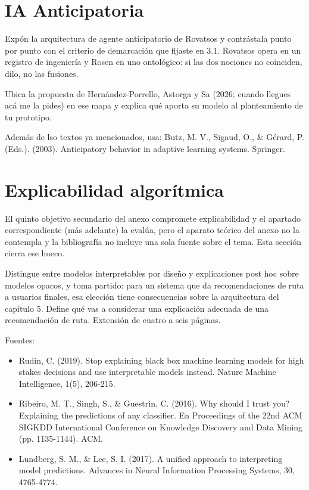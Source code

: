 \documentclass[letterpaper,12pt,oneside]{book}
\theoremstyle{definition}
\theoremstyle{plain}
\theoremstyle{remark}
\begin{document}
\section{IA Anticipatoria}
Expón la arquitectura de agente anticipatorio de Rovatsos y contrástala punto por punto con el criterio de demarcación que fijaste en 3.1. Rovatsos opera en un registro de ingeniería y Rosen en uno ontológico: si las dos nociones no coinciden, dilo, no las fusiones.

Ubica la propuesta de Hernández-Porrello, Astorga y Sa (2026; cuando llegues acá me la pides) en ese mapa y explica qué aporta su modelo al planteamiento de tu prototipo.

Además de lso textos ya mencionados, usa: Butz, M. V., Sigaud, O., \& Gérard, P. (Eds.). (2003). Anticipatory behavior in adaptive learning systems. Springer.

\section{Explicabilidad algorítmica}
El quinto objetivo secundario del anexo compromete explicabilidad y el apartado correspondiente (más adelante) la evalúa, pero el aparato teórico del anexo no la contempla y la bibliografía no incluye una sola fuente sobre el tema. Esta sección cierra ese hueco.

Distingue entre modelos interpretables por diseño y explicaciones post hoc sobre modelos opacos, y toma partido: para un sistema que da recomendaciones de ruta a usuarios finales, esa elección tiene consecuencias sobre la arquitectura del capítulo 5. Define qué vas a considerar una explicación adecuada de una recomendación de ruta. Extensión de cuatro a seis páginas.

Fuentes:

\begin{itemize}
    \item Rudin, C. (2019). Stop explaining black box machine learning models for high stakes decisions and use interpretable models instead. Nature Machine Intelligence, 1(5), 206-215. 
    \item Ribeiro, M. T., Singh, S., \& Guestrin, C. (2016). Why should I trust you? Explaining the predictions of any classifier. En Proceedings of the 22nd ACM SIGKDD International Conference on Knowledge Discovery and Data Mining (pp. 1135-1144). ACM. 
    \item Lundberg, S. M., \& Lee, S. I. (2017). A unified approach to interpreting model predictions. Advances in Neural Information Processing Systems, 30, 4765-4774.
\end{itemize}
\end{document}
